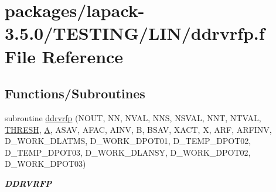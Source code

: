 \hypertarget{ddrvrfp_8f}{}\section{packages/lapack-\/3.5.0/\+T\+E\+S\+T\+I\+N\+G/\+L\+I\+N/ddrvrfp.f File Reference}
\label{ddrvrfp_8f}
\subsection*{Functions/\+Subroutines}
\begin{DoxyCompactItemize}
\item 
subroutine \hyperlink{group__double__lin_gaaa30d2f5a26c0f1efd26275e60d5468f}{ddrvrfp} (N\+O\+U\+T, N\+N, N\+V\+A\+L, N\+N\+S, N\+S\+V\+A\+L, N\+N\+T, N\+T\+V\+A\+L, \hyperlink{zlaqgs_8c_a0656018abfc9fa2821827415f5d5ea57}{T\+H\+R\+E\+S\+H}, \hyperlink{classA}{A}, A\+S\+A\+V, A\+F\+A\+C, A\+I\+N\+V, B, B\+S\+A\+V, X\+A\+C\+T, X, A\+R\+F, A\+R\+F\+I\+N\+V, D\+\_\+\+W\+O\+R\+K\+\_\+\+D\+L\+A\+T\+M\+S, D\+\_\+\+W\+O\+R\+K\+\_\+\+D\+P\+O\+T01, D\+\_\+\+T\+E\+M\+P\+\_\+\+D\+P\+O\+T02, D\+\_\+\+T\+E\+M\+P\+\_\+\+D\+P\+O\+T03, D\+\_\+\+W\+O\+R\+K\+\_\+\+D\+L\+A\+N\+S\+Y, D\+\_\+\+W\+O\+R\+K\+\_\+\+D\+P\+O\+T02, D\+\_\+\+W\+O\+R\+K\+\_\+\+D\+P\+O\+T03)
\begin{DoxyCompactList}\small\item\em {\bfseries D\+D\+R\+V\+R\+F\+P} \end{DoxyCompactList}\end{DoxyCompactItemize}
